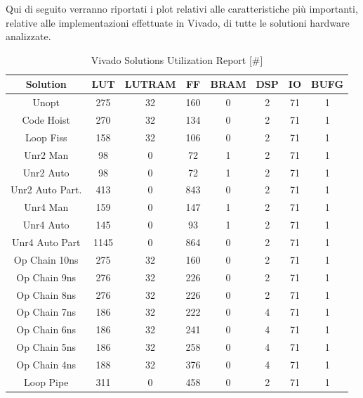 Qui di seguito verranno riportati i plot relativi alle caratteristiche più importanti, relative alle implementazioni effettuate in Vivado, di tutte le solutioni hardware analizzate.


\begin{table}[H]
	\centering
	\begin{tabular}{|c|c|c|c|c|c|c|c|}
		\hline
		\textbf{Solution} & \textbf{LUT} & \textbf{LUTRAM} & \textbf{FF} & \textbf{BRAM} & \textbf{DSP} & \textbf{IO} & \textbf{BUFG} \\
		\hline
		Unopt & 275 & 32 & 160 & 0 & 2 & 71 & 1 \\
		Code Hoist & 270 & 32 & 134 & 0 & 2 & 71 & 1 \\
		Loop Fiss & 158 & 32 & 106 & 0 & 2 & 71 & 1 \\
		Unr2 Man & 98 & 0 & 72 & 1 & 2 & 71 & 1 \\
		Unr2 Auto & 98 & 0 & 72 & 1 & 2 & 71 & 1 \\
		Unr2 Auto Part. & 413 & 0 & 843 & 0 & 2 & 71 & 1 \\
		Unr4 Man & 159 & 0 & 147 & 1 & 2 & 71 & 1 \\
		Unr4 Auto & 145 & 0 & 93 & 1 & 2 & 71 & 1 \\
		Unr4 Auto Part & 1145 & 0 & 864 & 0 & 2 & 71 & 1 \\
		Op Chain 10ns & 275 & 32 & 160 & 0 & 2 & 71 & 1 \\
		Op Chain 9ns & 276 & 32 & 226 & 0 & 2 & 71 & 1 \\
		Op Chain 8ns & 276 & 32 & 226 & 0 & 2 & 71 & 1 \\
		Op Chain 7ns & 186 & 32 & 222 & 0 & 4 & 71 & 1 \\
		Op Chain 6ns & 186 & 32 & 241 & 0 & 4 & 71 & 1 \\
		Op Chain 5ns & 186 & 32 & 258 & 0 & 4 & 71 & 1 \\
		Op Chain 4ns & 188 & 32 & 376 & 0 & 4 & 71 & 1 \\
		Loop Pipe & 311 & 0 & 458 & 0 & 2 & 71 & 1 \\
		\hline
	\end{tabular}
	\caption{Vivado Solutions Utilization Report [\#]}
	\label{tab:vivado-solutions-utilization-report}
\end{table}

